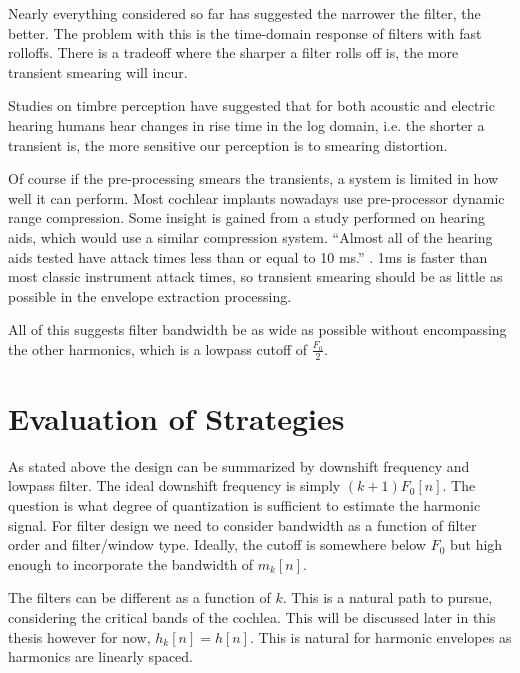 \documentclass [11pt, proquest,oneside] {ganter_thesis}[2015/03/03]
\begin{document}
Nearly everything considered so far has suggested the narrower the filter, the better.  The problem with this is the time-domain response of filters with fast rolloffs.  There is a tradeoff where the sharper a filter rolls off is, the more transient smearing will incur.

Studies on timbre perception \cite{kong2011temporal} have suggested that for both acoustic and electric hearing humans hear changes in rise time in the log domain, i.e. the shorter a transient is, the more sensitive our perception is to smearing distortion.

Of course if the pre-processing smears the transients, a system is limited in how well it can perform.  Most cochlear implants nowadays use pre-processor dynamic range compression.  Some insight is gained from a study performed on hearing aids, which would use a similar compression system.  ``Almost all of the hearing aids tested have attack times less than or equal to 10 ms.'' \cite{burnett1977attack}.  1ms is faster than most classic instrument attack times, so transient smearing should be as little as possible in the envelope extraction processing.

All of this suggests filter bandwidth be as wide as possible without encompassing the other harmonics, which is a lowpass cutoff of $\frac{F_0}{2}$.



\section{Evaluation of Strategies}

As stated above the design can be summarized by downshift frequency and lowpass filter.  The ideal downshift frequency is simply $(k+1)F_0[n]$.  The question is what degree of quantization is sufficient to estimate the harmonic signal.  For filter design we need to consider bandwidth as a function of filter order and filter/window type.  Ideally, the cutoff is somewhere below $F_0$ but high enough to incorporate the bandwidth of $m_k[n]$.

The filters can be different as a function of $k$.  This is a natural path to pursue, considering the critical bands of the cochlea.  This will be discussed later in this thesis however for now, $h_k[n] = h[n]$.  This is natural for harmonic envelopes as harmonics are linearly spaced.
\end{document}
